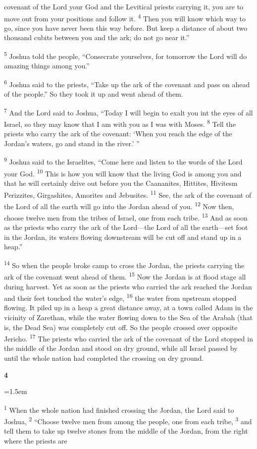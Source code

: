 \documentclass[12pt,twoside]{article}
\newcommand{\vs}[1]{\textsuperscript{#1}}
\newcommand{\chapterWithIndent}[2]{%
  \noindent
  \begin{minipage}[t]{1cm}
    \vspace{-0.4\baselineskip}
    {\fontsize{40pt}{48pt}\selectfont \textbf{#1}}
  \end{minipage}%
  \hspace{0.3cm}%
  \begin{minipage}[t]{\dimexpr\linewidth - 1.5cm - 0.3cm\relax}
    \hangindent=1.5em
    \hangafter=3
    #2
    \vspace{0.1cm}
  \end{minipage}
}
\begin{document}
\noindent covenant of the Lord your God and the Levitical priests carrying it, you are to move out from your positions and follow it.
\vs{4} Then you will know which way to go, since you have never been this way before. But keep a distance of about two thousand cubits between you and the ark; do not go near it.''

\vs{5} Joshua told the people, ``Consecrate yourselves, for tomorrow the Lord will do amazing things among you.''

\vs{6} Joshua said to the priests, ``Take up the ark of the covenant and pass on ahead of the people.'' So they took it up and went ahead of them.

\vs{7} And the Lord said to Joshua, ``Today I will begin to exalt you int the eyes of all Israel, so they may know that I am with you as I was with Moses.
\vs{8} Tell the priests who carry the ark of the covenant: `When you reach the edge of the Jordan's waters, go and stand in the river.' ''

\vs{9} Joshua said to the Israelites, ``Come here and listen to the words of the Lord your God.
\vs{10} This is how you will know that the living God is among you and that he will certainly drive out before you the Caananites, Hittites, Hivitesm Perizzites, Girgashites, Amorites and Jebusites.
\vs{11} See, the ark of the covenant of the Lord of all the earth will go into the Jordan ahead of you.
\vs{12} Now then, choose twelve men from the tribes of Israel, one from each tribe.
\vs{13} And as soon as the priests who carry the ark of the Lord---the Lord of all the earth---set foot in the Jordan, its waters flowing downstream will be cut off and stand up in a heap.''

\vs{14} So when the people broke camp to cross the Jordan, the priests carrying the ark of the covenant went ahead of them.
\vs{15} Now the Jordan is at flood stage all during harvest. Yet as soon as the priests who carried the ark reached the Jordan and their feet touched the water's edge,
\vs{16} the water from upstream stopped flowing. It piled up in a heap a great distance away, at a town called Adam in the vicinity of Zarethan, while the water flowing down to the Sea of the Arabah (that is, the Dead Sea) was completely cut off. So the people crossed over opposite Jericho.
\vs{17} The priests who carried the ark of the covenant of the Lord stopped in the middle of the Jordan and stood on dry ground, while all Israel passed by until the whole nation had completed the crossing on dry ground.

\chapterWithIndent{4}{
    \vs{1} When the whole nation had finished crossing the Jordan, the Lord said to Joshua,
    \vs{2} ``Choose twelve men from among the people, one from each tribe,
    \vs{3} and tell them to take up twelve stones from the middle of the Jordan, from the right where the priests are 
}
\end{document}
